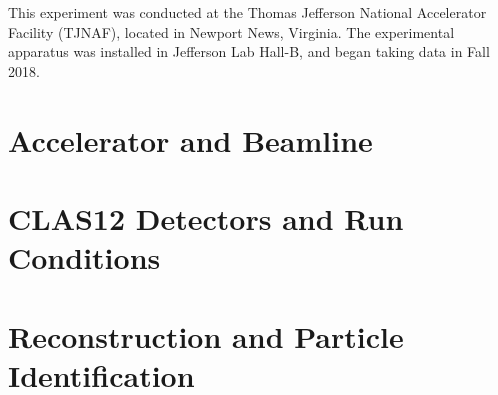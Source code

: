This experiment was conducted at the Thomas Jefferson National Accelerator Facility (TJNAF), located in Newport News, Virginia. The experimental apparatus was installed in Jefferson Lab Hall-B, and began taking data in Fall 2018. 

\section{Accelerator and Beamline}
                  


\section{CLAS12 Detectors and Run Conditions}\label{sec:clas12exp}
    

\clearpage
\section{Reconstruction and Particle Identification}
    







